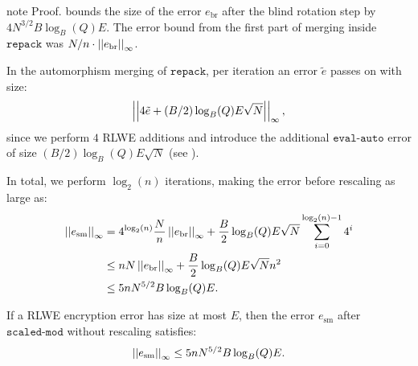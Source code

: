 \documentclass[letterpaper,10pt,english]{jupyterBook}
\begin{document}
\begin{sphinxadmonition}{note}
\sphinxAtStartPar
Proof. {\hyperref[\detokenize{Thesis:blind-rotation-error}]{}} bounds the size of the error \(e_{\text{br}}\) after the blind rotation step by \(4N^{3/2}B\log_B(Q)E\).
The error bound from the first part of merging inside \(\texttt{repack}\) was \(N/n \cdot \left\lvert\left\lvert  e_{\text{br}} \right\rvert\right\rvert_\infty\).

\sphinxAtStartPar
In the automorphism merging of \(\texttt{repack}\), per iteration an error \(\tilde e\) passes on with size:
\begin{equation*}
\begin{split}\left\lvert\left\lvert 4 \tilde e + (B/2)\log_B(Q) E \sqrt{N} \right\rvert\right\rvert_\infty,\end{split}
\end{equation*}
\sphinxAtStartPar
since we perform \(4\) RLWE additions and introduce the additional \(\texttt{eval-auto}\) error of size \((B/2)\log_B(Q) E \sqrt{N}\) (see {\hyperref[\detokenize{Thesis:automorphisms-of-r}]{}}).

\sphinxAtStartPar
In total, we perform \(\log_2(n)\) iterations, making the error before rescaling as large as:
\begin{equation*}
\begin{split}\begin{split}
\left\lvert\left\lvert e_{\text{sm}} \right\rvert\right\rvert_\infty &= 4^{\log_2(n)}\frac{N}{n}\left\lvert\left\lvert e_{\text{br}} \right\rvert\right\rvert_\infty + \frac{B}{2}\log_B(Q)E\sqrt{N}\sum_{i=0}^{\log_2(n)-1} 4^i \\
&\le nN\left\lvert\left\lvert e_{\text{br}} \right\rvert\right\rvert_\infty + \frac{B}{2}\log_B(Q)E\sqrt{N}n^2 \\
&\le 5nN^{5/2}B\log_B(Q)E.
\end{split}\end{split}
\end{equation*}\end{sphinxadmonition}

\sphinxAtStartPar
If a RLWE encryption error has size at most \(E\), then the error \(e_{\text{sm}}\) after \(\texttt{scaled-mod}\) without rescaling satisfies:
\begin{equation*}
\begin{split}\left\lvert\left\lvert e_{\text{sm}} \right\rvert\right\rvert_\infty \le 5nN^{5/2}B\log_B(Q)E.\end{split}
\end{equation*}
\begin{DUlineblock}{0em}
\item[] 
\end{DUlineblock}
\end{document}
